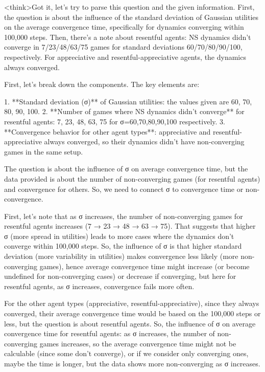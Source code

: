 <think>Got it, let's try to parse this question and the given information. First, the question is about the influence of the standard deviation of Gaussian utilities on the average convergence time, specifically for dynamics converging within 100,000 steps. Then, there's a note about resentful agents: NS dynamics didn't converge in 7/23/48/63/75 games for standard deviations 60/70/80/90/100, respectively. For appreciative and resentful-appreciative agents, the dynamics always converged.

First, let's break down the components. The key elements are:

1. **Standard deviation (σ)** of Gaussian utilities: the values given are 60, 70, 80, 90, 100.
2. **Number of games where NS dynamics didn't converge** for resentful agents: 7, 23, 48, 63, 75 for σ=60,70,80,90,100 respectively.
3. **Convergence behavior for other agent types**: appreciative and resentful-appreciative always converged, so their dynamics didn't have non-converging games in the same setup.

The question is about the influence of σ on average convergence time, but the data provided is about the number of non-converging games (for resentful agents) and convergence for others. So, we need to connect σ to convergence time or non-convergence.

First, let's note that as σ increases, the number of non-converging games for resentful agents increases (7 → 23 → 48 → 63 → 75). That suggests that higher σ (more spread in utilities) leads to more cases where the dynamics don't converge within 100,000 steps. So, the influence of σ is that higher standard deviation (more variability in utilities) makes convergence less likely (more non-converging games), hence average convergence time might increase (or become undefined for non-converging cases) or decrease if converging, but here for resentful agents, as σ increases, convergence fails more often.

For the other agent types (appreciative, resentful-appreciative), since they always converged, their average convergence time would be based on the 100,000 steps or less, but the question is about resentful agents. So, the influence of σ on average convergence time for resentful agents: as σ increases, the number of non-converging games increases, so the average convergence time might not be calculable (since some don't converge), or if we consider only converging ones, maybe the time is longer, but the data shows more non-converging as σ increases.

